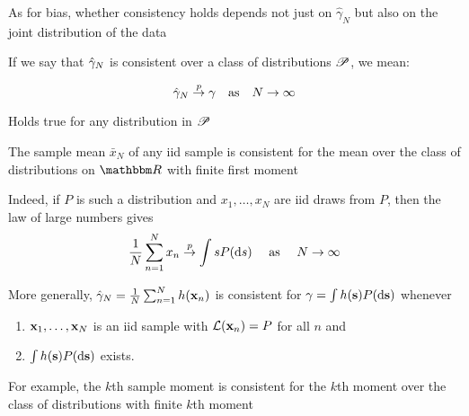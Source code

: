 \begin{frame}

    \vspace{2em}
    As for bias, whether consistency holds depends not just on $\hat
    \gamma_N$ but also on the joint
    distribution of the data
    
    \vspace{.7em}
    If we say that $\hat \gamma_N$ is consistent over a class
    of distributions $\mathscr P$, we mean:
    
    \begin{equation*}
        \hat \gamma_N \stackrel { p } {\to} \gamma
        \quad \text{as} \quad 
        N \to \infty
    \end{equation*}
    
    Holds true for any distribution in $\mathscr P$
    
\end{frame}

\begin{frame}

    \vspace{2em}
    \Eg
    The sample mean $\bar x_N$ of any {\sc iid} sample is consistent for the
    mean over the class of distributions on $\RR$
    with finite first moment
    
    Indeed, if $P$ is such a distribution and $x_1,
    \ldots, x_N$ are {\sc iid} draws from $P$, then the law of large numbers gives
    \begin{equation*}
        \frac{1}{N} \sum_{n=1}^N x_n \stackrel { p } {\to} \int s P(\mathop{}\!\mathrm{d} s)
         \quad \text{ as } \quad N \to \infty
    \end{equation*}
    
\end{frame}

\begin{frame}

    \vspace{2em}
    More generally,  $\hat \gamma_N = \frac{1}{N}
    \sum_{n=1}^N h({\mathbf x}_n)$ is consistent for $\gamma = \int h({\mathbf s}) P(\mathop{}\!\mathrm{d} {\mathbf s})$
    whenever
    \begin{enumerate}
        \item ${\mathbf x}_1, \ldots, {\mathbf x}_N$ is an {\sc iid} sample with
            $\mathcal L({\mathbf x}_n) = P$ for all $n$ and
        \item $\int h({\mathbf s}) P(\mathop{}\!\mathrm{d} {\mathbf s})$ exists.
    \end{enumerate}
    
    \vspace{.7em}
    For example, the $k$th sample moment is consistent for the $k$th moment over
    the class of distributions with finite $k$th moment
    
\end{frame}

